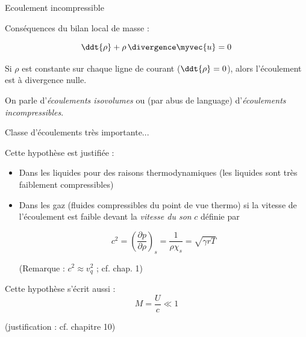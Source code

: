 \begin{frame}{Ecoulement incompressible}

\small



Conséquences du bilan local de masse :

$$
\ddt{\rho} + \rho \, \divergence \myvec{u} = 0
$$

Si $\rho$ est constante sur chaque ligne de courant ($\ddt{\rho} = 0$),
alors l'écoulement est à divergence nulle.

\medskip
\pause 
On parle d'{\em écoulements isovolumes} ou (par abus de language)
d'{\em écoulements incompressibles}.

\medskip 
\pause 
Classe d'écoulements très importante...


\medskip 
\pause 
Cette hypothèse  est justifiée :

\begin{itemize}
\item Dans les liquides pour des raisons thermodynamiques 
(les liquides sont très faiblement compressibles)

\item Dans les gaz (fluides compressibles du point de vue thermo) si la vitesse de l'écoulement est faible devant la {\em vitesse du son } $c$ définie par

$$
c^2 
= \left(\frac{\partial p}{\partial \rho} \right)_s = \frac{1}{\rho \chi_s} = 
\sqrt{\gamma r T}
$$

(Remarque : $c^2  \approx v_q^2$ ; cf. chap. 1)
\end{itemize}

\pause 
Cette hypothèse s'écrit aussi : 
$$ 
M =\frac{U}{c} \ll 1
$$

(justification : cf. chapitre 10)

\end{frame}


